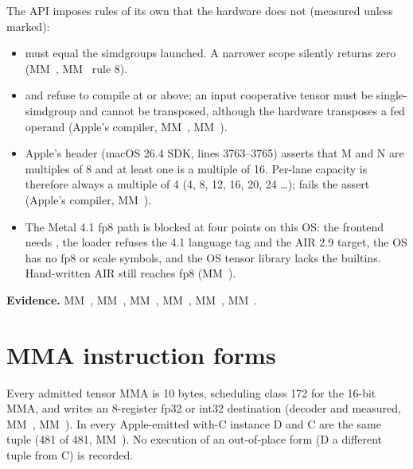 The API imposes rules of its own that the hardware does not (measured unless marked):

\begin{itemize}
\item {} must equal the simdgroups launched. A narrower scope silently returns zero (MM~,
  MM~ rule 8).
\item {} and  refuse to compile at  or above; an input cooperative
  tensor must be single-simdgroup and cannot be transposed, although the hardware transposes a fed operand (Apple's
  compiler, MM~, MM~).
\item Apple's header  (macOS 26.4 SDK, lines 3763–3765) asserts that M and N are multiples of
  8 and at least one is a multiple of 16. Per-lane capacity  is therefore always a multiple of 4 (4, 8, 12,
  16, 20, 24 \dots{});  fails the assert (Apple's compiler, MM~).
\item The Metal 4.1 fp8 path is blocked at four points on this OS: the frontend needs , the loader refuses the
  4.1 language tag and the AIR 2.9 target, the OS  has no fp8 or scale symbols, and the OS tensor
  library lacks the builtins. Hand-written AIR still reaches fp8 (MM~).
\end{itemize}

\textbf{Evidence.} MM~, MM~, MM~, MM~, MM~, MM~.

\section{MMA instruction forms}\label{sec:instruction-family}

Every admitted tensor MMA is 10 bytes, scheduling class 172 for the 16-bit MMA, and writes an 8-register fp32 or int32
destination (decoder and measured, MM~, MM~). In every Apple-emitted with-C instance D and C are the same tuple
(481 of 481, MM~). No execution of an out-of-place form (D a different tuple from C) is recorded.

